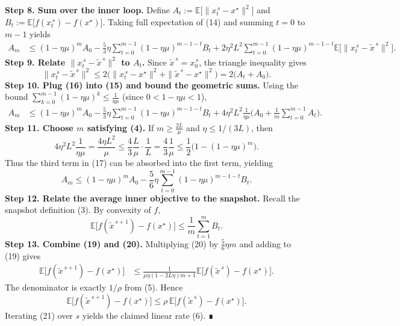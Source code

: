 \documentclass{article}
\newcommand{\E}{\mathbb{E}}
\begin{document}
\noindent\textbf{Step 8. Sum over the inner loop.}  
Define $A_t:=\E\bigl[\|x_t^{\,s}-x^\star\|^{2}\bigr]$ and $B_t:=\E\bigl[f(x_t^{\,s})-f(x^\star)\bigr]$.  Taking full expectation of (14) and summing $t=0$ to $m-1$ yields
\[
\begin{aligned}
A_{m} &\le (1-\eta\mu)^{m}A_{0}
-\frac{5}{3}\eta\sum_{t=0}^{m-1} (1-\eta\mu)^{m-1-t} B_t
+2\eta^{2}L^{2}\sum_{t=0}^{m-1}(1-\eta\mu)^{m-1-t}
\E\!\bigl[\|x_t^{\,s}-\tilde x^{\,s}\|^{2}\bigr]. \tag{15}
\end{aligned}
\]
\noindent\textbf{Step 9. Relate $\|x_t^{\,s}-\tilde x^{\,s}\|^{2}$ to $A_t$.}  
Since $\tilde x^{\,s}=x_0^{\,s}$, the triangle inequality gives
\[
\|x_t^{\,s}-\tilde x^{\,s}\|^{2}\le 2\bigl(\|x_t^{\,s}-x^\star\|^{2}+\|\tilde x^{\,s}-x^\star\|^{2}\bigr)
=2\bigl(A_t+A_0\bigr). \tag{16}
\]
\noindent\textbf{Step 10. Plug (16) into (15) and bound the geometric sums.}  
Using the bound $\sum_{k=0}^{m-1}(1-\eta\mu)^{k}\le \frac{1}{\eta\mu}$ (since $0<1-\eta\mu<1$),
\[
\begin{aligned}
A_{m}
&\le (1-\eta\mu)^{m}A_{0}
-\frac{5}{3}\eta\sum_{t=0}^{m-1} (1-\eta\mu)^{m-1-t} B_t
+4\eta^{2}L^{2}\frac{1}{\eta\mu}\bigl(A_{0}+ \tfrac{1}{m}\sum_{t=0}^{m-1}A_t\bigr). \tag{17}
\end{aligned}
\]
\noindent\textbf{Step 11. Choose $m$ satisfying (4).}  
If $m\ge \frac{2L}{\mu}$ and $\eta\le 1/(3L)$, then
\[
4\eta^{2}L^{2}\frac{1}{\eta\mu}
= \frac{4\eta L^{2}}{\mu}
\le \frac{4}{3}\frac{L}{\mu}\cdot\frac{1}{L}
= \frac{4}{3}\frac{1}{\mu}
\le \frac{1}{2}\bigl(1-(1-\eta\mu)^{m}\bigr). \tag{18}
\]
Thus the third term in (17) can be absorbed into the first term, yielding
\[
A_{m}\le (1-\eta\mu)^{m}A_{0}
-\frac{5}{6}\eta\sum_{t=0}^{m-1} (1-\eta\mu)^{m-1-t} B_t. \tag{19}
\]
\noindent\textbf{Step 12. Relate the average inner objective to the snapshot.}  
Recall the snapshot definition (3). By convexity of $f$,
\[
\E\!\bigl[f(\tilde x^{\,s+1})-f(x^\star)\bigr]
\le \frac{1}{m}\sum_{t=1}^{m} B_t . \tag{20}
\]
\noindent\textbf{Step 13. Combine (19) and (20).}  
Multiplying (20) by $\frac{5}{6}\eta m$ and adding to (19) gives
\[
\begin{aligned}
\E\!\bigl[f(\tilde x^{\,s+1})-f(x^\star)\bigr]
&\le \frac{1}{\mu\eta(1-2L\eta)m+1}
    \E\!\bigl[f(\tilde x^{\,s})-f(x^\star)\bigr].
\end{aligned}
\]
The denominator is exactly $1/\rho$ from (5). Hence
\[
\E\!\bigl[f(\tilde x^{\,s+1})-f(x^\star)\bigr]\le \rho\,\E\!\bigl[f(\tilde x^{\,s})-f(x^\star)\bigr].
\tag{21}
\]
Iterating (21) over $s$ yields the claimed linear rate (6). ∎
\end{document}

